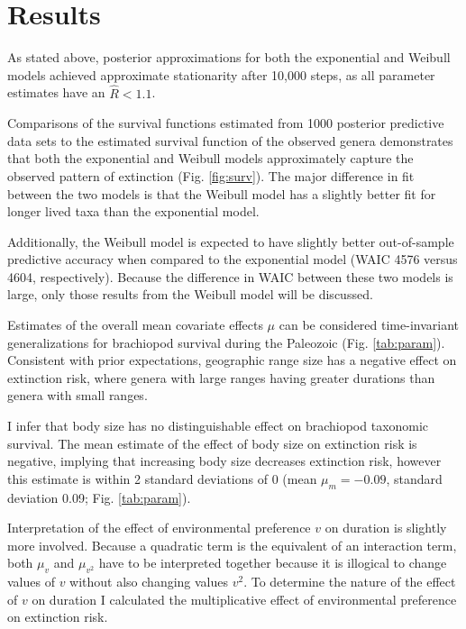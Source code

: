 \documentclass{article}
\begin{document}
\section{Results}

As stated above, posterior approximations for both the exponential and Weibull models achieved approximate stationarity after 10,000 steps, as all parameter estimates have an \(\hat{R} < 1.1\).%

Comparisons of the survival functions estimated from 1000 posterior predictive data sets to the estimated survival function of the observed genera demonstrates that both the exponential and Weibull models approximately capture the observed pattern of extinction (Fig. \ref{fig:surv}). The major difference in fit between the two models is that the Weibull model has a slightly better fit for longer lived taxa than the exponential model.


Additionally, the Weibull model is expected to have slightly better out-of-sample predictive accuracy when compared to the exponential model (WAIC 4576 versus 4604, respectively). Because the difference in WAIC between these two models is large, only those results from the Weibull model will be discussed.

Estimates of the overall mean covariate effects \(\mu\) can be considered time-invariant generalizations for brachiopod survival during the Paleozoic (Fig. \ref{tab:param}). Consistent with prior expectations, geographic range size has a negative effect on extinction risk, where genera with large ranges having greater durations than genera with small ranges. 

I infer that body size has no distinguishable effect on brachiopod taxonomic survival. The mean estimate of the effect of body size on extinction risk is negative, implying that increasing body size decreases extinction risk, however this estimate is within 2 standard deviations of 0 (mean \(\mu_{m} = -0.09\), standard deviation 0.09; Fig. \ref{tab:param}). 

Interpretation of the effect of environmental preference \(v\) on duration is slightly more involved. Because a quadratic term is the equivalent of an interaction term, both \(\mu_{v}\) and \(\mu_{v^{2}}\) have to be interpreted together because it is illogical to change values of \(v\) without also changing values \(v^{2}\). To determine the nature of the effect of \(v\) on duration I calculated the multiplicative effect of environmental preference on extinction risk.
\end{document}
